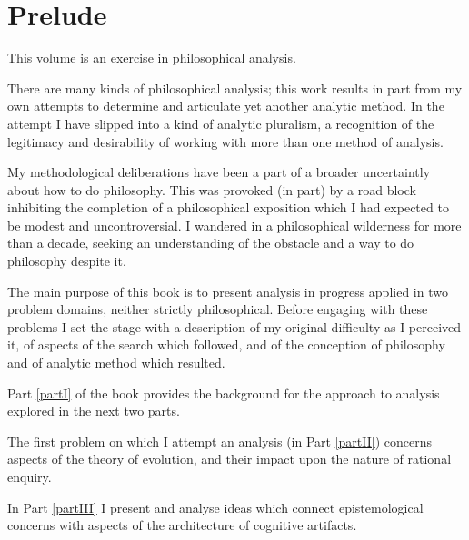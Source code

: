\mainmatter
\def\rbjidprelude{$$Id: prelude.tex,v 1.3 2010/02/01 11:34:11 rbj Exp $$}

\chapter{Prelude}\label{Prelude}

This volume is an exercise in philosophical analysis.

There are many kinds of philosophical analysis;
this work results in part from my own attempts to determine and articulate yet another analytic method.
In the attempt I have slipped into a kind of analytic pluralism, a recognition of the legitimacy and desirability of working with more than one method of analysis.

My methodological deliberations have been a part of a broader uncertaintly about how to do philosophy.
This was provoked (in part) by a road block inhibiting the completion of a philosophical exposition which I had expected to be modest and uncontroversial.
I wandered in a philosophical wilderness for more than a decade, seeking an understanding of the obstacle and a way to do philosophy despite it.

The main purpose of this book is to present analysis in progress applied in two problem domains, neither strictly philosophical.
Before engaging with these problems I set the stage with a description of my original difficulty as I perceived it, of aspects of the search which followed, and of the conception of philosophy and of analytic method which resulted.

Part \ref{partI} of the book provides the background for the approach to analysis explored in the next two parts.

The first problem on which I attempt an analysis (in Part \ref{partII}) concerns aspects of the theory of evolution, and their impact upon the nature of rational enquiry.

In Part \ref{partIII} I present and analyse ideas which connect epistemological concerns with aspects of the architecture of cognitive artifacts.

